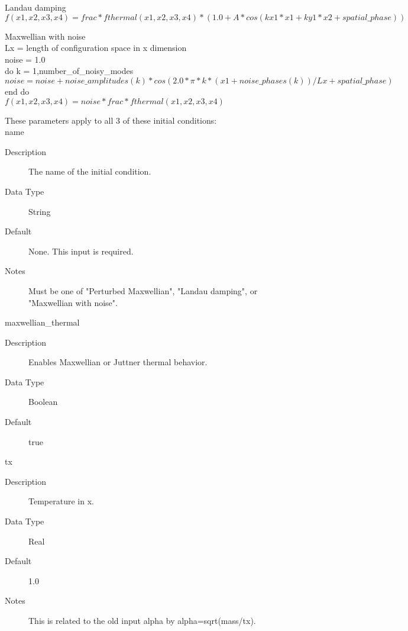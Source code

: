 \documentclass[11pt]{amsart}
\begin{document}
Landau damping \\
\begin{math}f(x1,x2,x3,x4) = frac*fthermal(x1,x2,x3,x4)*
  (1.0+A*cos(kx1*x1+ky1*x2+spatial\_phase))\end{math}

Maxwellian with noise \\
Lx = length of configuration space in x dimension \\
noise = 1.0 \\
do k = 1,number\_of\_noisy\_modes \\
\indent \begin {math} noise = noise+noise\_amplitudes(k)*cos(2.0*\pi*k*(x1+noise\_phases(k))/Lx+spatial\_phase) \end{math} \\
end do \\
\begin{math}f(x1,x2,x3,x4) = noise*frac*fthermal(x1,x2,x3,x4)\end{math}

These parameters apply to all 3 of these initial conditions: \\
\indent name
\begin{description}
\item [Description] The name of the initial condition.
\item [Data Type] String
\item [Default] None.  This input is required.
\item [Notes] Must be one of "Perturbed Maxwellian", "Landau damping", or
"Maxwellian with noise".
\end{description}

maxwellian\_thermal
\begin{description}
\item [Description] Enables Maxwellian or Juttner thermal behavior.
\item [Data Type] Boolean
\item [Default] true
\end{description}

tx
\begin{description}
\item [Description] Temperature in x.
\item [Data Type] Real
\item [Default] 1.0
\item [Notes] This is related to the old input alpha by alpha=sqrt(mass/tx).
\end{description}
\end{document}
